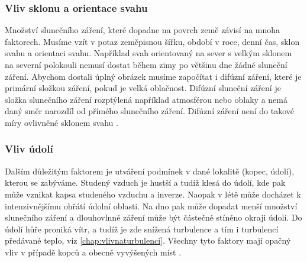 \subsubsection{Vliv sklonu a orientace svahu}
Množství slunečního záření, které dopadne na povrch země závisí na mnoha faktorech. Musíme vzít v potaz zeměpisnou šířku, období v roce, denní čas, sklon svahu a orientaci svahu. Například svah orientovaný na sever s velkým sklonem na severní polokouli nemusí dostat během zimy po většinu dne žádné sluneční záření. Abychom dostali úplný obrázek musíme započítat i difúzní záření, které je primární složkou záření, pokud je velká oblačnost. Difúzní sluneční záření je složka slunečního záření rozptýlená například atmosférou nebo oblaky a nemá daný směr narozdíl od přímého slunečního záření. Difúzní záření není do takové míry ovlivněné sklonem svahu \parencite{alma}.

\subsubsection{Vliv údolí}
Dalším důležitým faktorem je utváření podmínek v dané lokalitě (kopec, údolí), kterou se zabýváme. Studený vzduch je hustší a tudíž klesá do údolí, kde pak může vznikat kapsa studeného vzduchu a inverze. Naopak v létě může docházet k intenzivnějšímu ohřátí údolní oblasti. Na dno pak může dopadat menší množství slunečního záření a dlouhovlnné záření může být částečně stíněno okraji údolí. Do údolí hůře proniká vítr, a tudíž je zde snížená turbulence a tím i turbulencí předávané teplo, viz \ref{chap:vlivnaturbulenci}. Všechny tyto faktory mají opačný vliv v případě kopců a obecně vyvýšených míst \parencite{alma}. 



